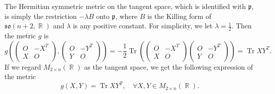 \documentclass[11pt]{amsart}
\theoremstyle{plain}
\theoremstyle{definition}
\numberwithin{equation}{section}
\DeclareMathOperator{\R}{\mathbb{R}}
\DeclareMathOperator{\tr}{Tr}
\newcommand{\Li}[1]{\mathfrak{#1}}
\begin{document}
The Hermitian symmetric metric on the tangent space, which is identified with $\Li{p}$, is simply the restriction $-\lambda B$ onto $\Li{p}$, where $B$ is the Killing form of $\Li{so}(n+2,\R)$ and $\lambda$ is any positive constant. For simplicity, we let $\lambda=\frac{1}{2}$. Then the metric $g$ is
\begin{equation*}
    g\left(\begin{pmatrix}
        O&-X^T\\
        X&O
    \end{pmatrix},
    \begin{pmatrix}
        O&-Y^T\\
        Y&O
    \end{pmatrix}\right)=-\frac{1}{2}\tr\left(\begin{pmatrix}
        O&-X^T\\
        X&O
    \end{pmatrix}
    \begin{pmatrix}
        O&-Y^T\\
        Y&O
    \end{pmatrix}\right)=\tr XY^T.
\end{equation*}
If we regard $M_{2\times n}(\R)$ as the tangent space, we get the following expression of the metric 
\[g(X,Y)=\tr XY^T,\quad \forall X,Y\in M_{2\times n}(\R).\]
\end{document}
